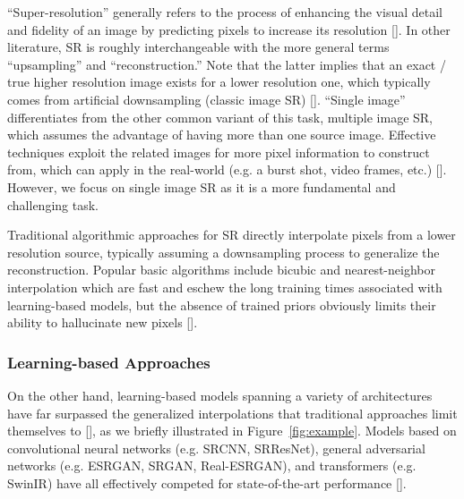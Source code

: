 \documentclass{article}
\begin{document}
“Super-resolution” generally refers to the process of enhancing the visual detail and fidelity of an image by predicting pixels to increase its resolution []. In other literature, SR is roughly interchangeable with the more general terms “upsampling” and “reconstruction.” Note that the latter implies that an exact / true higher resolution image exists for a lower resolution one, which typically comes from artificial downsampling (classic image SR) []. “Single image”  differentiates from the other common variant of this task, multiple image SR, which assumes the advantage of having more than one source image. Effective techniques exploit the related images for more pixel information to construct from, which can apply in the real-world (e.g. a burst shot, video frames, etc.) []. However, we focus on single image SR as it is a more fundamental and challenging task.

Traditional algorithmic approaches for SR directly interpolate pixels from a lower resolution source, typically assuming a downsampling process to generalize the reconstruction. Popular basic algorithms include bicubic and nearest-neighbor interpolation which are fast and eschew the long training times associated with learning-based models, but the absence of trained priors obviously limits their ability to hallucinate new pixels [].

\subsubsection{Learning-based Approaches}

On the other hand, learning-based models spanning a variety of architectures have far surpassed the generalized interpolations that traditional approaches limit themselves to [], as we briefly illustrated in Figure~\ref{fig:example}. Models based on convolutional neural networks (e.g. SRCNN, SRResNet), general adversarial networks (e.g. ESRGAN, SRGAN, Real-ESRGAN), and transformers (e.g. SwinIR) have all effectively competed for state-of-the-art performance [].
\end{document}
